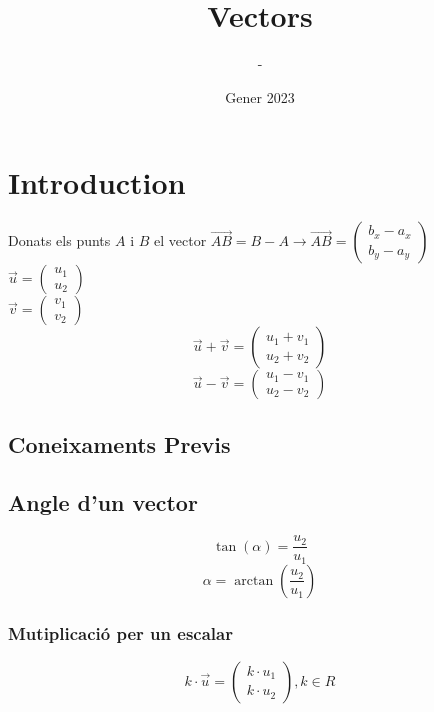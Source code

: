 \documentclass[12pt,a4paper]{article}
\title{Vectors}
\author{-}
\date{Gener 2023}
\begin{document}
\maketitle

\section{Introduction}
Donats els punts $A$ i $B$ el vector $\vec{AB} = B - A \longrightarrow \vec{AB} = \begin{pmatrix}
    b_x - a_x \\
    b_y - a_y
    \end{pmatrix}$\\
$\Vec{u} = \begin{pmatrix}
    u_1 \\
    u_2
\end{pmatrix}$\\[5pt]
$
\Vec{v} = \begin{pmatrix}
    v_1 \\
    v_2
\end{pmatrix}
$
\\[10pt]
$$\Vec{u} + \Vec{v} = \begin{pmatrix}
    u_1 + v_1 \\
    u_2 + v_2
\end{pmatrix}
$$
$$\Vec{u} - \Vec{v} = \begin{pmatrix}
    u_1 - v_1 \\
    u_2 - v_2
\end{pmatrix}$$
\subsection{Coneixaments Previs}

\subsection{Angle d'un vector}

$$\tan(\alpha)=\frac{u_2}{u_1}$$
$$\alpha=\arctan\left(\frac{u_2}{u_1}\right)$$

\subsubsection{Mutiplicació per un escalar}

    $$
    k \cdot \Vec{u} = \begin{pmatrix}
        k \cdot u_1 \\
        k \cdot u_2
    \end{pmatrix}
    , k \in R
    $$
    
\end{document}
